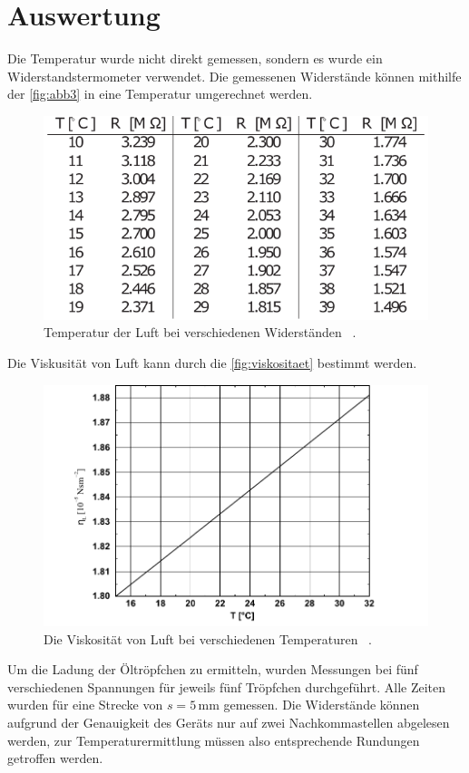\section{Auswertung}

Die Temperatur wurde nicht direkt gemessen, sondern es wurde ein Widerstandstermometer verwendet.
Die gemessenen Widerstände können mithilfe der \autoref{fig:abb3} in eine Temperatur umgerechnet werden.
\begin{figure}[H]
  \centering
  \includegraphics{figures/Temperatur.pdf}
  \caption{Temperatur der Luft bei verschiedenen Widerständen \cite{ap12}\, .} 
  \label{fig:abb3}
\end{figure}
Die Viskusität von Luft kann durch die \autoref{fig:viskositaet} bestimmt werden.
\begin{figure}[H]
  \centering
  \includegraphics{figures/Viskositaet.pdf}
  \caption{Die Viskosität von Luft bei verschiedenen Temperaturen  \cite{ap12}\, .} 
  \label{fig:viskositaet}
\end{figure}


Um die Ladung der Öltröpfchen zu ermitteln, wurden Messungen bei fünf verschiedenen Spannungen für jeweils fünf Tröpfchen durchgeführt.
Alle Zeiten wurden für eine Strecke von $s = 5 \, \unit{\milli\meter}$ gemessen.
Die Widerstände können aufgrund der Genauigkeit des Geräts nur auf zwei Nachkommastellen abgelesen werden, zur Temperaturermittlung
müssen also entsprechende Rundungen getroffen werden. \\

